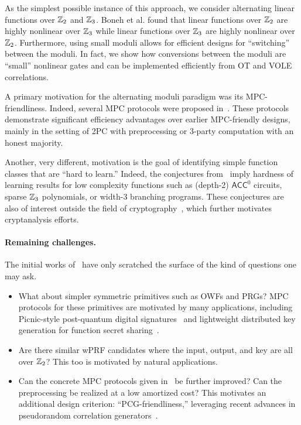 As the simplest possible instance of this approach, we consider alternating linear functions over $\mathbb{Z}_2$ and $\mathbb{Z}_3$. Boneh et al. found that linear functions over $\mathbb{Z}_2$ are highly nonlinear over $\mathbb{Z}_3$ while linear functions over $\mathbb{Z}_3$ are highly nonlinear over $\mathbb{Z}_2$. Furthermore, using small moduli allows for efficient designs for ``switching'' between the moduli. In fact, we show how conversions between the moduli are “small” nonlinear gates and can be implemented efficiently from OT and VOLE correlations.
\fi

A primary motivation for the alternating moduli paradigm was its MPC-friendliness. Indeed, several MPC protocols were proposed in~\cite{boneh2018-darkmatter}. These protocols demonstrate significant efficiency advantages over earlier MPC-friendly designs, mainly in the setting of 2PC with preprocessing or 3-party computation with an honest majority. 

Another, very different, motivation is the goal of identifying simple function classes that are ``hard to learn.''  Indeed,  the conjectures from~\cite{boneh2018-darkmatter} imply hardness of learning results for low complexity functions such as (depth-2) $\mathsf{ACC}^0$ circuits, sparse $\mathbb{Z}_3$ polynomials, or width-3 branching programs. These conjectures are also of interest outside the field of cryptography~\cite{Chen19,FilmusIKK20,ChenR20,KabanetsKLMO20}, which further motivates cryptanalysis efforts.

\paragraph{Remaining challenges.} The initial works of~\cite{boneh2018-darkmatter,cheon2020-adventures} have only scratched the surface of the kind of questions one may ask. 
\begin{itemize}
\item
What about simpler symmetric primitives such as OWFs and PRGs? MPC protocols for these primitives are motivated by many applications, including Picnic-style post-quantum digital signatures~\cite{Picnicrefs} and lightweight distributed key generation for function secret sharing~\cite{Doernershelat,FSS-EC21}.
\item Are there similar wPRF candidates where the input, output, and key are all over $\mathbb{Z}_2$? This too is motivated by natural applications.
\item Can the concrete MPC protocols given in~\cite{boneh2018-darkmatter} be further improved? Can the preprocessing be realized at a low amortized cost? This motivates an additional design criterion: ``PCG-friendliness,'' leveraging recent advances in pseudorandom correlation generators~\cite{BCGI18,BoyleetalCCS19,yang2020-ferret}.
\end{itemize}

